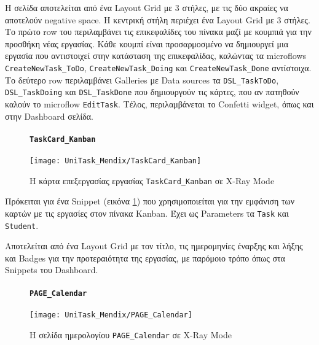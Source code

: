                 Η σελίδα αποτελείται από ένα Layout Grid με 3 στήλες, με τις δύο ακραίες να αποτελούν negative space. Η κεντρική στήλη περιέχει ένα Layout Grid με 3 στήλες. Το πρώτο row του περιλαμβάνει τις επικεφαλίδες του πίνακα μαζί με κουμπιά για την προσθήκη νέας εργασίας. Κάθε κουμπί είναι προσαρμοσμένο να δημιουργεί μια εργασία που αντιστοιχεί στην κατάσταση της επικεφαλίδας, καλώντας τα microflows \texttt{CreateNewTask\_ToDo}, \texttt{CreateNewTask\_Doing} και \texttt{CreateNewTask\_Done} αντίστοιχα. Το δεύτερο row περιλαμβάνει Galleries με Data sources τα \texttt{DSL\_TaskToDo}, \texttt{DSL\_TaskDoing} και \texttt{DSL\_TaskDone} που δημιουργούν τις κάρτες, που αν πατηθούν καλούν το microflow \texttt{EditTask}. Τέλος, περιλαμβάνεται το Confetti widget, όπως και στην Dashboard σελίδα.

                \newpage

                \begin{figure}[H] \noindent
                    \paragraph{\texttt{TaskCard\_Kanban}}
                    \begin{center}
                        \texttt{[image: UniTask\_Mendix/TaskCard\_Kanban]}
                        \caption{\centering Η κάρτα επεξεργασίας εργασίας \texttt{TaskCard\_Kanban} σε X-Ray Mode}
                        \label{fig:unitask_TaskCard_Kanban}
                    \end{center}
                \end{figure}

                Πρόκειται για ένα Snippet (εικόνα \ref{fig:unitask_TaskCard_Kanban}) που χρησιμοποιείται για την εμφάνιση των καρτών με τις εργασίες στον πίνακα Kanban. Έχει ως Parameters τα \texttt{Task} και \texttt{Student}.

                Αποτελείται από ένα Layout Grid με τον τίτλο, τις ημερομηνίες έναρξης και λήξης και Badges για την προτεραιότητα της εργασίας, με παρόμοιο τρόπο όπως στα Snippets του Dashboard.

                \begin{figure}[H] \noindent
                    \paragraph{\texttt{PAGE\_Calendar}}
                    \begin{center}
                        \texttt{[image: UniTask\_Mendix/PAGE\_Calendar]}
                        \caption{\centering Η σελίδα ημερολογίου \texttt{PAGE\_Calendar} σε X-Ray Mode}
                        \label{fig:unitask_PAGE_Calendar}
                    \end{center}
                \end{figure}

